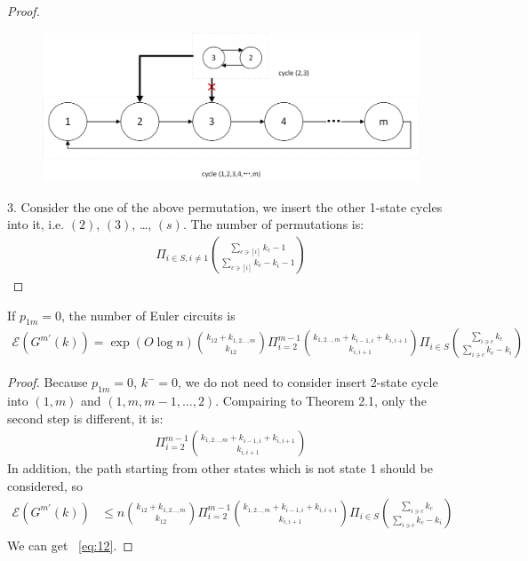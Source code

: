 \documentclass[11pt,en,cite=authoryear]{elegantpaper}
\begin{document}
\begin{proof}
\begin{figure}[h]
    \end{figure}
    \begin{figure}[h]
        \centering
        \includegraphics[scale=0.5]{insert2.png}
    \end{figure}

    3. Consider the one of the  above permutation, we insert the other 1-state cycles into it, i.e. $(2)$, $(3)$, \dots, $(s)$.  The number of permutations is:
    \begin{align*}
        \Pi_{i\in S, i\neq 1} \binom{\sum_{c \ni [i]} k_{c} - 1}{\sum_{c \ni [i]} k_{c} - k_{i} - 1}
    \end{align*}
\end{proof}

\begin{corollary}
    If $p_{1m}=0$, the number of Euler circuits is 
    \begin{align} \label{eq:12}
        \mathcal{E} (G^{m'} (k))
        = \exp(O \log n)  \binom{k_{12}+k_{1,2\dots ,m}}{k_{12}} 
        \Pi_{i=2}^{m-1} \binom{k_{1,2\dots ,m}+ k_{i-1, i}+ k_{i, i+1}}{k_{i, i+1}}
        \Pi_{i \in S} \binom{\sum_{i\ni c} k_{c}}{\sum_{i\ni c} k_{c} - k_{i}}
    \end{align}
\end{corollary}
\begin{proof}
    Because $p_{1m}=0$, $k^-=0$, we do not need to consider insert 2-state cycle  into $(1,m)$ and $(1, m, m-1, \dots, 2)$. Compairing to Theorem 2.1, only the second step is different, it is:
    \begin{align*}
        \Pi_{i=2}^{m-1} \binom{k_{1,2\dots ,m}+ k_{i-1, i}+ k_{i, i+1}}{k_{i, i+1}}
    \end{align*}
    In addition, the path starting from other states which is not state 1 should be considered, so
    \begin{align*}
        \mathcal{E} (G^{m'} (k))
        &\le  n \binom{k_{12}+k_{1,2\dots ,m}}{k_{12}} 
        \Pi_{i=2}^{m-1} \binom{k_{1,2\dots ,m}+ k_{i-1, i}+ k_{i, i+1}}{k_{i, i+1}}
        \Pi_{i \in S} \binom{\sum_{i\ni c} k_{c}}{\sum_{i\ni c} k_{c} - k_{i}}\\
    \end{align*}
    We can get ~\ref{eq:12}.
\end{proof}
\end{document}

